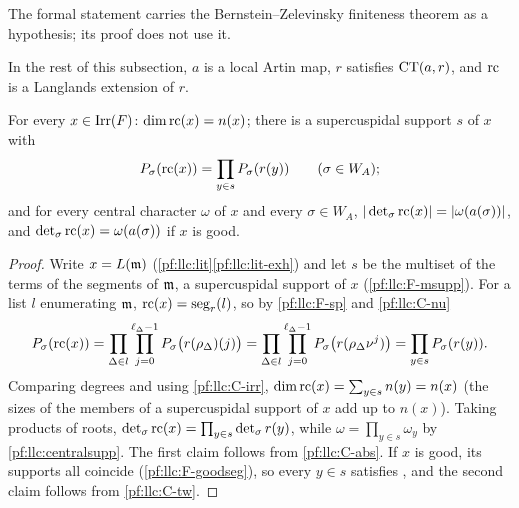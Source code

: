 The formal statement carries the Bernstein--Zelevinsky finiteness theorem as a hypothesis; its proof does not use it.

In the rest of this subsection, $a$ is a local Artin map, $r$ satisfies $\operatorname{CT}(a,r)$, and $\mathrm{rc}$ is a Langlands extension
of $r$.

\begin{proposition}\label{pf:llc:extdim}
For every $x\in\operatorname{Irr}(F)$: $\dim\mathrm{rc}(x)=n(x)$; there is a supercuspidal support $s$ of $x$ with
\begin{equation}\label{pf:llc:eq-charpol}
  P_\sigma(\mathrm{rc}(x))=\prod_{y\in s}P_\sigma(r(y))\qquad(\sigma\in W_A);
\end{equation}
and for every central character $\omega$ of $x$ and every $\sigma\in W_A$, $|\det_\sigma\mathrm{rc}(x)|=|\omega(a(\sigma))|$, and
$\det_\sigma\mathrm{rc}(x)=\omega(a(\sigma))$ if $x$ is good. 
\end{proposition}

\begin{proof}
Write $x=L(\mathfrak m)$ (\cref{pf:llc:lit}\ref{pf:llc:lit-exh}) and let $s$ be the multiset of the terms of the segments of
$\mathfrak m$, a supercuspidal support of $x$ (\ref{pf:llc:F-msupp}). For a list $l$ enumerating $\mathfrak m$, $\mathrm{rc}(x)=\operatorname{seg}_r(l)$,
so by \ref{pf:llc:F-sp} and \ref{pf:llc:C-nu}
\[
  P_\sigma(\mathrm{rc}(x))=\prod_{\Delta\in l}\prod_{j=0}^{\ell_\Delta-1}P_\sigma\bigl(r(\rho_\Delta)(j)\bigr)
  =\prod_{\Delta\in l}\prod_{j=0}^{\ell_\Delta-1}P_\sigma\bigl(r(\rho_\Delta\nu^j)\bigr)=\prod_{y\in s}P_\sigma(r(y)).
\]
Comparing degrees and using \ref{pf:llc:C-irr}, $\dim\mathrm{rc}(x)=\sum_{y\in s}n(y)=n(x)$ (the sizes of the members of a
supercuspidal support of $x$ add up to $n(x)$). Taking products of roots,
$\det_\sigma\mathrm{rc}(x)=\prod_{y\in s}\det_\sigma r(y)$, while $\omega=\prod_{y\in s}\omega_y$ by \cref{pf:llc:centralsupp}.
The first claim follows from \ref{pf:llc:C-abs}. If $x$ is good, its supports all coincide (\ref{pf:llc:F-goodseg}), so every
$y\in s$ satisfies \llcGo{}, and the second claim follows from \ref{pf:llc:C-tw}.
\end{proof}

